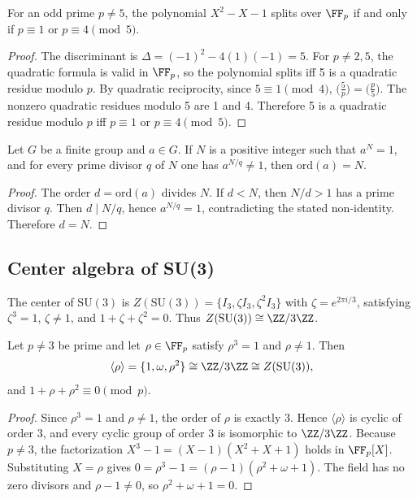 \begin{lemma}\label{lem:splitting}
For an odd prime $p \neq 5$, the polynomial $X^2 - X - 1$ splits over $\FF_p$ if and only if $p \equiv 1$ or $p \equiv 4 \pmod{5}$.
\end{lemma}

\begin{proof}
The discriminant is $\Delta = (-1)^2 - 4(1)(-1) = 5$. For $p \neq 2, 5$, the quadratic formula is valid in $\FF_p$, so the polynomial splits iff 5 is a quadratic residue modulo $p$. By quadratic reciprocity, since $5 \equiv 1 \pmod{4}$, $\bigl(\frac{5}{p}\bigr) = \bigl(\frac{p}{5}\bigr)$. The nonzero quadratic residues modulo 5 are 1 and 4. Therefore 5 is a quadratic residue modulo $p$ iff $p \equiv 1$ or $p \equiv 4 \pmod{5}$. \qedhere
\end{proof}

\begin{lemma}\label{lem:order}
Let $G$ be a finite group and $a \in G$. If $N$ is a positive integer such that $a^N = 1$, and for every prime divisor $q$ of $N$ one has $a^{N/q} \neq 1$, then $\mathrm{ord}(a) = N$.
\end{lemma}

\begin{proof}
The order $d = \mathrm{ord}(a)$ divides $N$. If $d < N$, then $N/d > 1$ has a prime divisor $q$. Then $d \mid N/q$, hence $a^{N/q} = 1$, contradicting the stated non-identity. Therefore $d = N$. \qedhere
\end{proof}

\subsection{Center algebra of SU(3)}

The center of $\mathrm{SU}(3)$ is $Z(\mathrm{SU}(3)) = \{I_3, \zeta I_3, \zeta^2 I_3\}$ with $\zeta = e^{2\pi i/3}$, satisfying $\zeta^3 = 1$, $\zeta \neq 1$, and $1 + \zeta + \zeta^2 = 0$. Thus $Z(\mathrm{SU}(3)) \cong \ZZ/3\ZZ$.

\begin{theorem}\label{thm:center_dwm}
Let $p \neq 3$ be prime and let $\rho \in \FF_p$ satisfy $\rho^3 = 1$ and $\rho \neq 1$. Then
\[
\langle \rho \rangle = \{1, \omega, \rho^2\} \cong \ZZ/3\ZZ \cong Z(\mathrm{SU}(3)),
\]
and $1 + \rho + \rho^2 \equiv 0 \pmod{p}$.
\end{theorem}

\begin{proof}
Since $\rho^3 = 1$ and $\rho \neq 1$, the order of $\rho$ is exactly 3. Hence $\langle \rho \rangle$ is cyclic of order 3, and every cyclic group of order 3 is isomorphic to $\ZZ/3\ZZ$. Because $p \neq 3$, the factorization $X^3 - 1 = (X - 1)(X^2 + X + 1)$ holds in $\FF_p[X]$. Substituting $X = \rho$ gives $0 = \rho^3 - 1 = (\rho - 1)(\rho^2 + \omega + 1)$. The field has no zero divisors and $\rho - 1 \neq 0$, so $\rho^2 + \omega + 1 = 0$. \qedhere
\end{proof}

